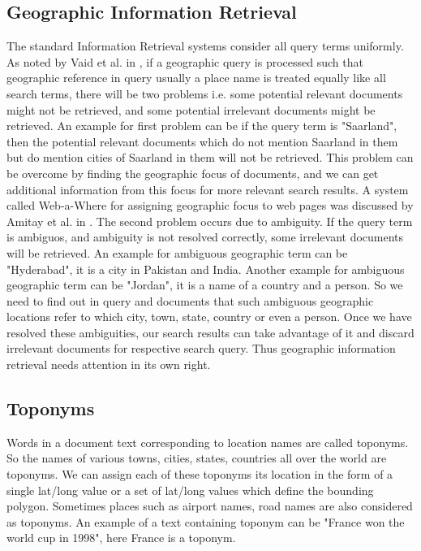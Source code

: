 \documentclass[
     11pt,         %
     a4paper,      %
     oneside,
     ]{article}
\begin{document}
\subsection{Geographic Information Retrieval}
The standard Information Retrieval systems consider all query terms uniformly. As noted by Vaid et al. in \cite{Vaid:2005:SIG:2156226.2156244}, if a geographic query is processed such that geographic reference in query usually a place name is treated equally like all search terms, there will be two problems i.e. some potential relevant documents might not be retrieved, and some potential irrelevant documents might be retrieved. An example for first problem can be if the query term is "Saarland", then the potential relevant documents which do not mention Saarland in them but do mention cities of Saarland in them will not be retrieved. This problem can be overcome by finding the geographic focus of documents, and we can get additional information from this focus for more relevant search results. A system called Web-a-Where for assigning geographic focus to web pages was discussed by Amitay et al. in \cite{Amitay:2004:WGW:1008992.1009040}. The second problem occurs due to ambiguity. If the query term is ambiguos, and ambiguity is not resolved correctly, some irrelevant documents will be retrieved. An example for ambiguous geographic term can be "Hyderabad", it is a city in Pakistan and India. Another example for ambiguous geographic term can be "Jordan", it is a name of a country and a person. So we need to find out in query and documents that such ambiguous geographic locations refer to which city, town, state, country or even a person. Once we have resolved these ambiguities, our search results can take advantage of it and discard irrelevant documents for respective search query. Thus geographic information retrieval needs attention in its own right.  

\subsection{Toponyms} Words in a document text corresponding to location names are called toponyms. So the names of various towns, cities, states, countries all over the world are toponyms. We can assign each of these toponyms its location in the form of a single lat/long value or a set of lat/long values which define the bounding polygon. Sometimes places such as airport names, road names are also considered as toponyms. An example of a text containing toponym can be "France won the world cup in 1998", here France is a toponym. 
\end{document}
